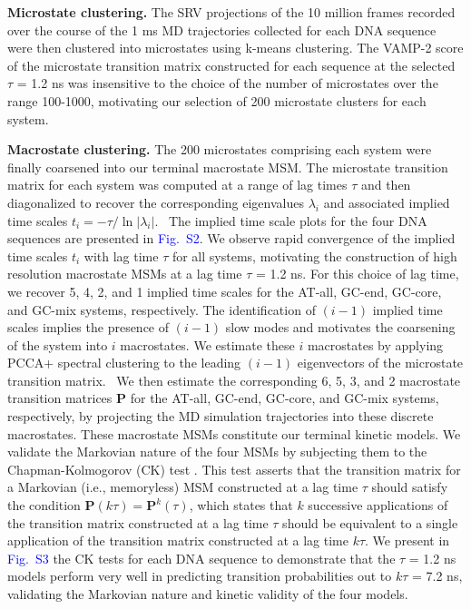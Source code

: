 \documentclass[journal=jpcbfk,manuscript=article]{achemso}
\newcommand*{\blauw}[1]{\textcolor{blue}{#1}}
\begin{document}
\textbf{Microstate clustering.} The SRV projections of the 10 million frames recorded over the course of the 1 ms MD trajectories collected for each DNA sequence were then clustered into microstates using k-means clustering. The VAMP-2 score of the microstate transition matrix constructed for each sequence at the selected $\tau$ = 1.2 ns was insensitive to the choice of the number of microstates over the range 100-1000, motivating our selection of 200 microstate clusters for each system.

\textbf{Macrostate clustering.} The 200 microstates comprising each system were finally coarsened into our terminal macrostate MSM. The microstate transition matrix for each system was computed at a range of lag times $\tau$ and then diagonalized to recover the corresponding eigenvalues $\lambda_i$ and associated implied time scales $t_i = -\tau / \ln \left| \lambda_i \right|$.~\citep{Wehmeyer2019IntroductionV1.0} The implied time scale plots for the four DNA sequences are presented in \blauw{Fig.~S2}. We observe rapid convergence of the implied time scales $t_i$ with lag time $\tau$ for all systems, motivating the construction of high resolution macrostate MSMs at a lag time $\tau$ = 1.2 ns. For this choice of lag time, we recover 5, 4, 2, and 1 implied time scales for the AT-all, GC-end, GC-core, and GC-mix systems, respectively. The identification of $(i-1)$ implied time scales implies the presence of $(i-1)$ slow modes and motivates the coarsening of the system into $i$ macrostates. We estimate these $i$ macrostates by applying PCCA+ spectral clustering to the leading $(i-1)$ eigenvectors of the microstate transition matrix.~\citep{Roblitz2013FuzzyClassification, Weber2018ImplicationsSimulation, Kube2007AConformations} We then estimate the corresponding 6, 5, 3, and 2 macrostate transition matrices $\mathbf{P}$ for the AT-all, GC-end, GC-core, and GC-mix systems, respectively, by projecting the MD simulation trajectories into these discrete macrostates. These macrostate MSMs constitute our terminal kinetic models. We validate the Markovian nature of the four MSMs by subjecting them to the Chapman-Kolmogorov (CK) test \citep{Noe2009ConstructingSimulations,Phys2011MarkovValidation,  Wehmeyer2019IntroductionV1.0}. This test asserts that the transition matrix for a Markovian (i.e., memoryless) MSM constructed at a lag time $\tau$ should satisfy the condition $\mathbf{P}(k \tau) = \mathbf{P}^k(\tau)$, which states that $k$ successive applications of the transition matrix constructed at a lag time $\tau$ should be equivalent to a single application of the transition matrix constructed at a lag time $k \tau$. We present in \blauw{Fig.~S3} the CK tests for each DNA sequence to demonstrate that the $\tau$ = 1.2 ns models perform very well in predicting transition probabilities out to $k \tau$ = 7.2 ns, validating the Markovian nature and kinetic validity of the four models.
\end{document}
